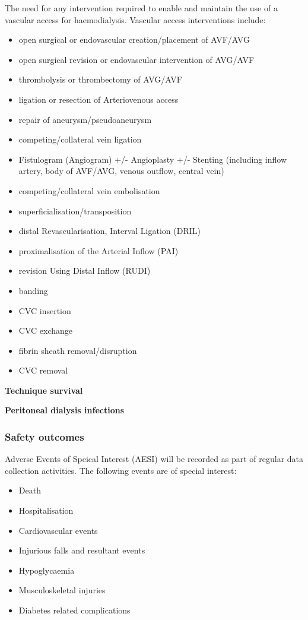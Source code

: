 \documentclass[
]{article}
\providecommand{\tightlist}{%
  \setlength{\itemsep}{0pt}\setlength{\parskip}{0pt}}
\begin{document}
The need for any intervention required to enable and maintain the use of a vascular access for haemodialysis.
Vascular access interventions include:
\begin{itemize}\tightlist
  \item open surgical or endovascular creation/placement of AVF/AVG
  \item open surgical revision or endovascular intervention of AVG/AVF
  \item thrombolysis or thrombectomy of AVG/AVF
  \item ligation or resection of Arteriovenous access
  \item repair of aneurysm/pseudoaneurysm
  \item competing/collateral vein ligation
  \item Fistulogram (Angiogram) +/- Angioplasty +/- Stenting (including inflow artery, body of AVF/AVG, venous outflow, central vein)
  \item competing/collateral vein embolisation
  \item superficialisation/transposition
  \item distal Revascularisation, Interval Ligation (DRIL)
  \item proximalisation of the Arterial Inflow (PAI)
  \item revision Using Distal Inflow (RUDI)
  \item banding
  \item CVC insertion
  \item CVC exchange
  \item fibrin sheath removal/disruption
  \item CVC removal
\end{itemize}


\textbf{Technique survival}

\textbf{Peritoneal dialysis infections}


\hypertarget{safety-outcomes}{
  \subsubsection{Safety outcomes}\label{safety-outcomes}}

Adverse Events of Speical Interest (AESI) will be recorded as part of regular data collection activities.
The following events are of special interest:
\begin{itemize}\tightlist
  \item Death
  \item Hospitalisation
  \item Cardiovascular events
  \item Injurious falls and resultant events
  \item Hypoglycaemia
  \item Musculoskeletal injuries
  \item Diabetes related complications
\end{itemize}
\end{document}
